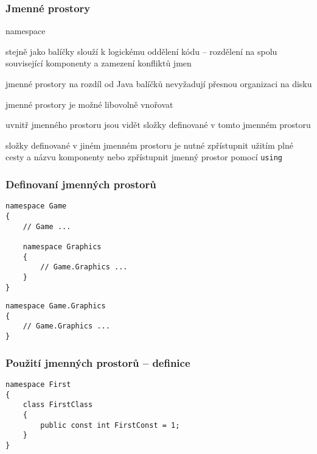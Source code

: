 
\begin{frame}[fragile]
\frametitle{Jmenné prostory}
\vfill
\begin{bitemize}{namespace}
\item stejně jako balíčky slouží k logickému oddělení kódu -- rozdělení na spolu související komponenty a zamezení konfliktů jmen
\item jmenné prostory na rozdíl od Java balíčků nevyžadují přesnou organizaci na disku
\item jmenné prostory je možné libovolně vnořovat
\end{bitemize}
\vfill
\begin{bitemize}{}
\item uvnitř jmenného prostoru jsou vidět složky definované v tomto jmenném prostoru
\item složky definované v jiném jmenném prostoru je nutné zpřístupnit užitím plné cesty a názvu komponenty nebo zpřístupnit jmenný prostor pomocí \lstinline|using|
\end{bitemize}
\vfill
\end{frame}


\begin{frame}[fragile]
\frametitle{Definovaní jmenných prostorů}

\begin{yesblock}
\begin{lstlisting}
namespace Game
{
    // Game ...

    namespace Graphics
    {
        // Game.Graphics ...
    }
}
\end{lstlisting}
\end{yesblock}
\vfill
\begin{yesblock}
\begin{lstlisting}
namespace Game.Graphics
{
    // Game.Graphics ...
}
\end{lstlisting}
\end{yesblock}
\end{frame}




\begin{frame}[fragile]
\frametitle{Použití jmenných prostorů -- definice}

\begin{yesblock}
\begin{lstlisting}
namespace First
{
    class FirstClass
    {
        public const int FirstConst = 1;
    }
}
\end{lstlisting}
\end{yesblock}
\end{frame}




